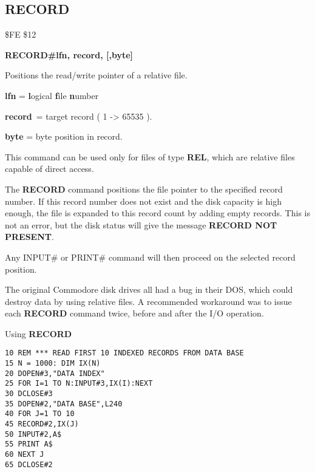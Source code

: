
\newpage
\subsection{RECORD}
\begin{description}[leftmargin=2cm,style=nextline]
\item [Token:] \$FE \$12
\item [Format:] {\bf RECORD\#lfn, record, [,byte]}
\item [Usage:]  Positions the read/write pointer of a relative file.

                {\bf lfn} = {\bf l}ogical {\bf f}ile {\bf n}umber

                {\bf record} = target record ( 1 -> 65535 ).

                {\bf byte} = byte position in record.

                This command can be used only for files of
                type {\bf REL}, which are relative files capable
                of direct access.

               The {\bf RECORD} command positions the file pointer
               to the specified record number. If this record number
               does not exist and the disk capacity is high enough,
               the file is expanded to this record count by adding
               empty records. This is not an error, but the disk
               status will give the message {\bf RECORD NOT PRESENT}.

               Any INPUT\# or PRINT\# command will then proceed
               on the selected record position.

\item [Remarks:] The original Commodore disk drives all had a bug
               in their DOS, which could destroy data by using
               relative files. A recommended workaround was to
               issue each {\bf RECORD} command twice, before
               and after the I/O operation.

\item [Example:] Using {\bf RECORD}
\begin{tcolorbox}[colback=black,coltext=white]
\verbatimfont{\codefont}
\begin{verbatim}
10 REM *** READ FIRST 10 INDEXED RECORDS FROM DATA BASE
15 N = 1000: DIM IX(N)
20 DOPEN#3,"DATA INDEX"
25 FOR I=1 TO N:INPUT#3,IX(I):NEXT
30 DCLOSE#3
35 DOPEN#2,"DATA BASE",L240
40 FOR J=1 TO 10
45 RECORD#2,IX(J)
50 INPUT#2,A$
55 PRINT A$
60 NEXT J
65 DCLOSE#2
\end{verbatim}
\end{tcolorbox}
\end{description}


